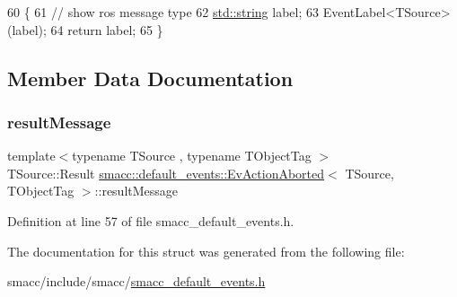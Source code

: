 \begin{DoxyCode}
60   \{
61     \textcolor{comment}{// show ros message type}
62     \hyperlink{namespacetesting_1_1internal_a8e8ff5b11e64078831112677156cb111}{std::string} label;
63     EventLabel<TSource>(label);
64     \textcolor{keywordflow}{return} label;
65   \}
\end{DoxyCode}


\subsection{Member Data Documentation}
\mbox{\label{structsmacc_1_1default__events_1_1EvActionAborted_a0cd103e20d922ab5039022b67fffd5f7}} 
\subsubsection{\texorpdfstring{result\+Message}{resultMessage}}
{\footnotesize\ttfamily template$<$typename T\+Source , typename T\+Object\+Tag $>$ \\
T\+Source\+::\+Result \hyperlink{structsmacc_1_1default__events_1_1EvActionAborted}{smacc\+::default\+\_\+events\+::\+Ev\+Action\+Aborted}$<$ T\+Source, T\+Object\+Tag $>$\+::result\+Message}



Definition at line 57 of file smacc\+\_\+default\+\_\+events.\+h.



The documentation for this struct was generated from the following file\+:\begin{DoxyCompactItemize}
\item 
smacc/include/smacc/\hyperlink{smacc__default__events_8h}{smacc\+\_\+default\+\_\+events.\+h}\end{DoxyCompactItemize}

